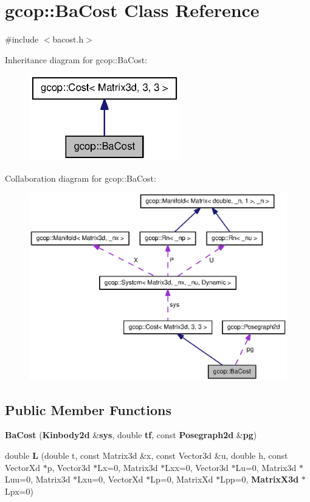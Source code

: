 \section{gcop\-:\-:\-Ba\-Cost \-Class \-Reference}
\label{classgcop_1_1BaCost}


{\ttfamily \#include $<$bacost.\-h$>$}



\-Inheritance diagram for gcop\-:\-:\-Ba\-Cost\-:\nopagebreak
\begin{figure}[H]
\begin{center}
\leavevmode
\includegraphics[width=186pt]{classgcop_1_1BaCost__inherit__graph}
\end{center}
\end{figure}


\-Collaboration diagram for gcop\-:\-:\-Ba\-Cost\-:\nopagebreak
\begin{figure}[H]
\begin{center}
\leavevmode
\includegraphics[width=350pt]{classgcop_1_1BaCost__coll__graph}
\end{center}
\end{figure}
\subsection*{\-Public \-Member \-Functions}
\begin{DoxyCompactItemize}
\item 
{\bf \-Ba\-Cost} ({\bf \-Kinbody2d} \&{\bf sys}, double {\bf tf}, const {\bf \-Posegraph2d} \&{\bf pg})
\item 
double {\bf \-L} (double t, const \-Matrix3d \&x, const \-Vector3d \&u, double h, const \-Vector\-Xd $\ast$p, \-Vector3d $\ast$\-Lx=0, \-Matrix3d $\ast$\-Lxx=0, \-Vector3d $\ast$\-Lu=0, \-Matrix3d $\ast$\-Luu=0, \-Matrix3d $\ast$\-Lxu=0, \-Vector\-Xd $\ast$\-Lp=0, \-Matrix\-Xd $\ast$\-Lpp=0, {\bf \-Matrix\-X3d} $\ast$\-Lpx=0)
\end{DoxyCompactItemize}
